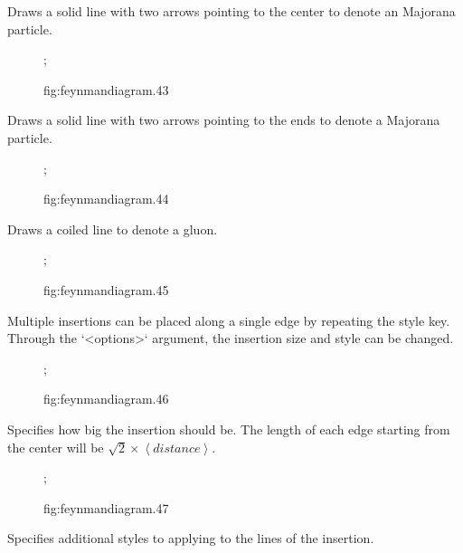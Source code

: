 \documentclass[UTF8]{article}
\begin{document}
Draws a solid line with two arrows pointing to the center to denote an Majorana particle.

\begin{figure}[hp]
    \centering
    ;
    \caption{fig:feynmandiagram.43}
    \label{fig:feynmandiagram.43}
\end{figure}

Draws a solid line with two arrows pointing to the ends to denote a Majorana particle.

\begin{figure}[hp]
    \centering
    ;
    \caption{fig:feynmandiagram.44}
    \label{fig:feynmandiagram.44}
\end{figure}

Draws a coiled line to denote a gluon.

\begin{figure}[hp]
    \centering
    ;
    \caption{fig:feynmandiagram.45}
    \label{fig:feynmandiagram.45}
\end{figure}

Multiple insertions can be placed along a single edge by repeating the style key.
Through the `<options>` argument, the insertion size and style can be changed.

\begin{figure}[hp]
    \centering
    ;
    \caption{fig:feynmandiagram.46}
    \label{fig:feynmandiagram.46}
\end{figure}

Specifies how big the insertion should be. The length of each edge starting from the center will be $\sqrt{2} \times \left< distance \right>$.

\begin{figure}[hp]
    \centering
    ;
    \caption{fig:feynmandiagram.47}
    \label{fig:feynmandiagram.47}
\end{figure}

Specifies additional styles to applying to the lines of the insertion.
\end{document}
